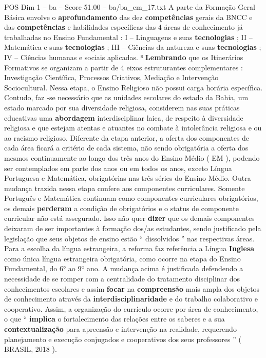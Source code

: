 \begin{textsample}{POS Dim 1 – ba – Score 51.00 – ba/ba\_em\_17.txt}
A parte da Formação Geral Básica envolve o \textbf{aprofundamento} das dez \textbf{competências} gerais da BNCC e das \textbf{competências} e habilidades específicas das 4 áreas de conhecimento já trabalhadas no Ensino Fundamental : I – Linguagens e suas \textbf{tecnologias} ; II – Matemática e suas \textbf{tecnologias} ; III – Ciências da natureza e suas \textbf{tecnologias} ; IV – Ciências humanas e sociais aplicadas. ⁸ \textbf{Lembrando} que os Itinerários Formativos se organizam a partir de 4 eixos estruturantes complementares : Investigação Científica, Processos Criativos, Mediação e Intervenção Sociocultural.
Nessa etapa, o Ensino Religioso não possui carga horária específica.
Contudo, faz -se necessário que as unidades escolares do estado da Bahia, um estado marcado por sua diversidade religiosa, considerem nas suas práticas educativas uma \textbf{abordagem} interdisciplinar laica, de respeito à diversidade religiosa e que estejam atentas e atuantes no combate à intolerância religiosa e ou ao racismo religioso.
Diferente da etapa anterior, a oferta dos componentes de cada área ficará a critério de cada sistema, não sendo obrigatória a oferta dos mesmos continuamente ao longo dos três anos do Ensino Médio ( EM ), podendo ser contemplados em parte dos anos ou em todos os anos, exceto Língua Portuguesa e Matemática, obrigatórias nas três séries do Ensino Médio.
Outra mudança trazida nessa etapa confere aos componentes curriculares.
Somente Português e Matemática continuam como componentes curriculares obrigatórios, os demais \textbf{perderam} a condição de obrigatórios e o status de componente curricular não está assegurado.
Isso não quer \textbf{dizer} que os demais componentes deixaram de ser importantes à formação dos/as estudantes, sendo justificado pela legislação que seus objetos de ensino estão “ dissolvidos ” nas respectivas áreas.
Para a escolha da língua estrangeira, a reforma faz referência a Língua \textbf{Inglesa} como única língua estrangeira obrigatória, como ocorre na etapa do Ensino Fundamental, do 6{\EmojiFont °} ao 9º ano.
A mudança acima é justificada defendendo a necessidade de se romper com a centralidade do tratamento disciplinar dos conhecimentos escolares e assim \textbf{focar} na \textbf{compreensão} mais ampla dos objetos de conhecimento através da \textbf{interdisciplinaridade} e do trabalho colaborativo e cooperativo.
Assim, a organização do currículo ocorre por área de conhecimento, o que “ \textbf{implica} o fortalecimento das relações entre os saberes e a sua \textbf{contextualização} para apreensão e intervenção na realidade, requerendo planejamento e execução conjugados e cooperativos dos seus professores ” ( BRASIL, 2018 ).

\end{textsample}
